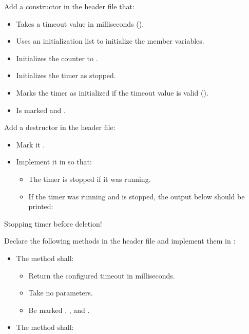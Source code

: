 \begin{parts}
\begin{itemize}
\begin{itemize}
    \end{itemize}
  \end{itemize}
  \item Add a constructor in the header file that:
  \begin{itemize}
    \item Takes a timeout value in milliseconds ().
    \item Uses an initialization list to initialize the member variables.
    \item Initializes the counter to .
    \item Initializes the timer as stopped.
    \item Marks the timer as initialized if the timeout value is valid ().
    \item Is marked  and .
  \end{itemize}
  \item Add a destructor in the header file:
  \begin{itemize}
    \item Mark it .
    \item Implement it in  so that:
    \begin{itemize}
      \item The timer is stopped if it was running.
      \item If the timer was running and is stopped, the output below should be printed:
    \end{itemize}
  \end{itemize}
\begin{console}
Stopping timer before deletion!
\end{console}
  \item Declare the following methods in the header file and implement them in
    :
  \begin{itemize}
    \item The method  shall:
    \begin{itemize}
      \item Return the configured timeout in milliseconds.
      \item Take no parameters.
      \item Be marked , , and \code{[[nodiscard]]}.
    \end{itemize}
    \item The method  shall:
    \begin{itemize}

\end{itemize}
\end{itemize}
\end{parts}
